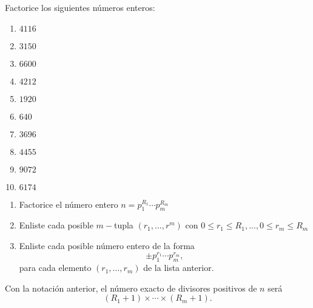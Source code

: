  
 
 
 	\begin{problema}
 		Factorice los siguientes números enteros:
 		\begin{multicols}{2}
 			\begin{enumerate}
 				\item $4116$
 				\item $3150$
 				\item $6600$
 				\item $4212$
 				\item $1920$
 				\item $640$
 				\item $3696$
 				\item $4455$
 				\item $9072$
 				\item $6174$
 			\end{enumerate}
 			
 		\end{multicols}
 		
 	\end{problema}
 	
 
 
 
 	\begin{algoritmo}
 		\begin{enumerate}
 			\item Factorice el número entero
 			$n=p_{1}^{R_{1}}\cdots p_{m}^{R_{m}}$
 			\item Enliste cada posible $m-$tupla
 			$\left( r_{1},...,r^{m} \right)$
 			con $0\leq r_{1}\leq R_{1},...,0\leq r_{m}\leq R_{m}$
 			\item Enliste cada posible número entero de la forma $$\pm p_{1}^{r_{1}}\cdots p_{m}^{r_{m}},$$ para cada elemento $\left( r_{1},...,r_{m} \right)$ de la lista anterior.
 		\end{enumerate}
 	\end{algoritmo}
 	
 
 
 
 	\begin{observacion}
 		Con la notaci\'on anterior, el número exacto de divisores positivos de $n$ será 
 		$$
 		(R_{1}+1)\times \cdots \times(R_{m}+1).
 		$$
 	\end{observacion}
 	
 
 
